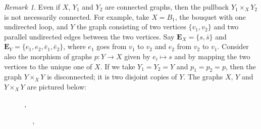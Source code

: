 \documentclass[11pt]{amsart}
\numberwithin{equation}{section}
\theoremstyle{remark}
\newtheorem{remark}[theorem]{Remark}
\begin{document}
\begin{remark}
Even if $X$, $Y_{1}$ and $Y_{2}$ are connected graphs, then the pullback $Y_{1} \times_{X} Y_{2}$ is not necessarily connected.  For example, take $X = B_{1}$, the bouquet with one undirected loop, and $Y$ the graph consisting of two vertices $\{v_{1},v_{2}\}$ and two parallel undirected edges between the two vertices.  Say $\mathbf{E}_{X} = \{s,\bar{s}\}$ and $\mathbf{E}_{Y} = \{e_{1},e_{2},\bar{e}_{1},\bar{e}_{2}\}$, where $e_{1}$ goes from $v_{1}$ to $v_{2}$ and $e_{2}$ from $v_{2}$ to $v_{1}$.  Consider also the morphism of graphs $p:Y \rightarrow X$ given by $e_{i} \mapsto s$ and by mapping the two vertices to the unique one of $X$.  If we take $Y_{1} = Y_{2} = Y$ and $p_{1} = p_{2} = p$, then the graph $Y\times_{X}Y$ is disconnected; it is two disjoint copies of $Y$.  The graphs $X$, $Y$ and $Y \times_{X}Y$ are pictured below:
\begin{figure}[h]
\begin{center}
, \, \, \,
 \, \, \,, \, \,
 \, \, \, \, \,
\end{center}
\end{figure}
\end{remark}
\end{document}

